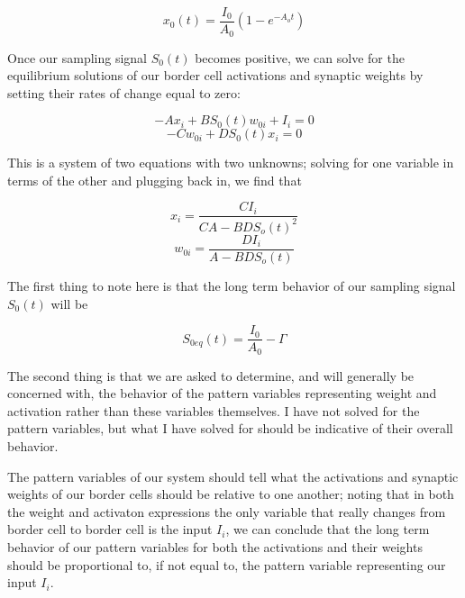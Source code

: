 \documentclass[a4paper,12pt]{article}
\begin{document}
\begin{equation}
  x_0(t) = \frac{I_0}{A_0}(1-e^{-A_ot})
\end{equation}

Once our sampling signal $S_0(t)$ becomes positive, we can solve for the equilibrium solutions of our border cell activations and synaptic weights by setting their rates of change equal to zero:

\begin{equation}
  -Ax_i+BS_0(t)w_{0i} + I_i = 0
\end{equation}
\begin{equation}
  -Cw_{0i}+DS_0(t)x_i = 0
\end{equation}

This is a system of two equations with two unknowns; solving for one variable in terms of the other and plugging back in, we find that

\begin{equation}
  x_i=\frac{CI_i}{CA-BDS_o(t)^2}
\end{equation}
\begin{equation}
  w_{0i}=\frac{DI_i}{A-BDS_o(t)}
\end{equation}

The first thing to note here is that the long term behavior of our sampling signal $S_0(t)$ will be 

\begin{equation}
  S_{0eq}(t) = \frac{I_0}{A_0} - \Gamma
\end{equation}

The second thing is that we are asked to determine, and will generally be concerned with, the behavior of the pattern variables representing weight and activation rather than these variables themselves. I have not solved for the pattern variables, but what I have solved for should be indicative of their overall behavior. 

\vspace{2mm}

The pattern variables of our system should tell what the activations and synaptic weights of our border cells should be relative to one another; noting that in both the weight and activaton expressions the only variable that really changes from border cell to border cell is the input $I_i$, we can conclude that the long term behavior of our pattern variables for both the activations and their weights should be proportional to, if not equal to, the pattern variable representing our input $I_i$. 

\vspace{2mm}
\end{document}
